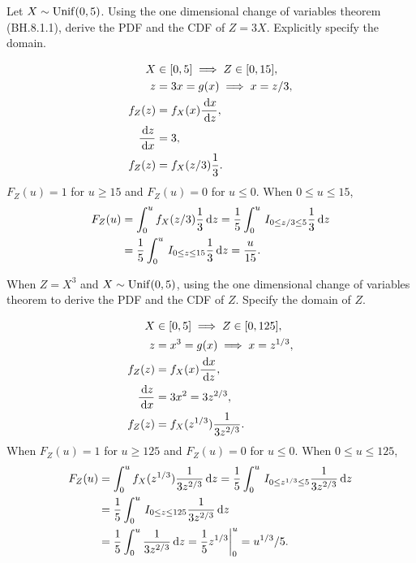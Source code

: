 \begin{exercise}
Let $X \sim \mathrm{Unif}(0, 5)$. Using the one dimensional change of variables theorem (BH.8.1.1),  derive the PDF and the CDF of $Z=3X$. Explicitly specify the domain.
\begin{solution}
  \begin{align}
X &\in [0, 5]  \implies Z \in [0, 15],\\
z &= 3x = g(x) \implies x = z/3, \\
f_{Z}(z) &= f_{X}(x) \frac{\,\textrm{d}x}{\,\textrm{d}z},\\
\frac{\,\textrm{d}z}{\,\textrm{d}x} &= 3,\\
f_{Z}(z) &= f_{X}(z/3) \frac{1}{3}.
  \end{align}
$F_{Z}(u) = 1$ for $u\geq 15$ and $F_{Z}(u) = 0$ for $u\leq 0$. When $0\leq u \leq 15$,
  \begin{align}
  F_{Z}(u) &= \int_{0}^{u} f_{X}(z/3) \frac{1}{3} \,\textrm{d}z = \frac{1}{5}\int_{0}^{u} \,I_{0\leq  z/3\leq 5}  \frac{1}{3} \,\textrm{d}z \\
&= \frac{1}{5}\int_{0}^{u} \,I_{0\leq z\leq 15}  \frac{1}{3} \,\textrm{d}z = \frac{u}{15}.
  \end{align}
\end{solution}
\end{exercise}


\begin{exercise}
When $Z=X^3$ and $X\sim \mathrm{Unif}(0,5)$, using the one dimensional change of variables theorem to  derive the PDF and the CDF of $Z$. Specify the domain of $Z$.
\begin{solution}
\begin{align}
X &\in [0, 5]  \implies Z \in [0, 125],\\
z &= x^{3} = g(x) \implies x = z^{1/3}, \\
f_{Z}(z) &= f_{X}(x) \frac{\,\textrm{d}x}{\,\textrm{d}z},\\
\frac{\,\textrm{d}z}{\,\textrm{d}x} &= 3 x^{2} = 3 z^{2/3},\\
f_{Z}(z) &= f_{X}(z^{1/3}) \frac{1}{3z^{2/3}}.
 \end{align}
When $F_{Z}(u) = 1$ for $u\geq 125$ and $F_{Z}(u) = 0$ for $u\leq 0$. When $0\leq u \leq 125$,
 \begin{align}
 F_{Z}(u) &= \int_{0}^{u} f_{X}(z^{1/3}) \frac{1}{3z^{2/3}} \,\textrm{d}z = \frac{1}{5}\int_{0}^{u} \,I_{0\leq  z^{1/3}\leq 5}  \frac{1}{3z^{2/3}} \,\textrm{d}z \\
&= \frac{1}{5}\int_{0}^{u} \,I_{0\leq z\leq 125}  \frac{1}{3z^{2/3}} \,\textrm{d}z \\
&= \frac{1}{5}\int_{0}^{u}  \frac{1}{3z^{2/3}} \,\textrm{d}z =  \frac{1}{5}z^{1/3}\biggr|_{0}^{u} = u^{1/3}/5.
 \end{align}
\end{solution}
\end{exercise}



